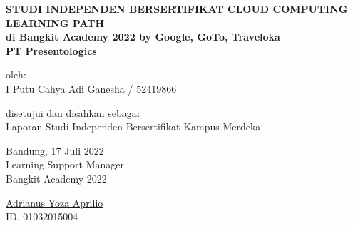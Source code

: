 {
\vspace*{0.5cm}
\begin{center}
    \textbf{STUDI INDEPENDEN BERSERTIFIKAT CLOUD COMPUTING LEARNING PATH} \\
    \textbf{di Bangkit Academy 2022 by Google, GoTo, Traveloka} \\
    \textbf{PT Presentologics} 
    
\end{center}

\vspace*{0.5cm}

\begin{center}
    oleh: \\
    I Putu Cahya Adi Ganesha / 52419866
\end{center}

\vfill

\begin{center}
    disetujui dan disahkan sebagai \\
    Laporan Studi Independen Bersertifikat Kampus Merdeka \\
\end{center}

\vspace{2mm}

\vspace*{0.2cm}

\vspace{5mm}

\vfill
\noindent Bandung, 17 Juli 2022 \\
\noindent Learning Support Manager \\
\noindent Bangkit Academy 2022 \\

\vspace{2.3cm}

\noindent \underline{Adrianus Yoza Aprilio} \\
\noindent ID. 01032015004

\vspace{10mm}


\vspace*{0.5cm}
}